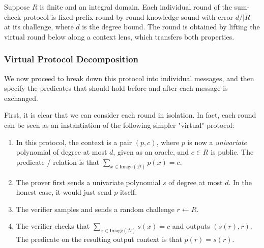 \begin{theorem}
    \label{thm:sumcheck_single_round_soundness}
    \leanok
    Suppose $R$ is finite and an integral domain. Each individual round of the sum-check protocol is fixed-prefix round-by-round knowledge sound with error $d / |R|$ at its challenge, where $d$ is the degree bound. The round is obtained by lifting the virtual round below along a context lens, which transfers both properties.
\end{theorem}

\subsubsection{Virtual Protocol Decomposition}

We now proceed to break down this protocol into individual messages, and then specify the predicates that should hold before and after each message is exchanged.

First, it is clear that we can consider each round in isolation. In fact, each round can be seen as an instantiation of the following simpler "virtual" protocol:

\begin{definition}
    \label{def:virtual_sumcheck_round_protocol}
    \leanok
    \begin{enumerate}
        \item In this protocol, the context is a pair $(p, c)$, where $p$ is now a \emph{univariate} polynomial of degree at most $d$, given as an oracle, and $c \in R$ is public. The predicate / relation is that $\sum_{x \in \text{Image}(\mathcal{D})} p(x) = c$.
        \item The prover first sends a univariate polynomial $s$ of degree at most $d$. In
        the honest case, it would just send $p$ itself.
        \item The verifier samples and sends a random challenge $r \gets R$.
        \item The verifier checks that $\sum_{x \in \text{Image}(\mathcal{D})} s(x) = c$ and outputs $(s(r), r)$. The predicate on the resulting output context
        is that $p(r) = s(r)$.
    \end{enumerate}
\end{definition}

